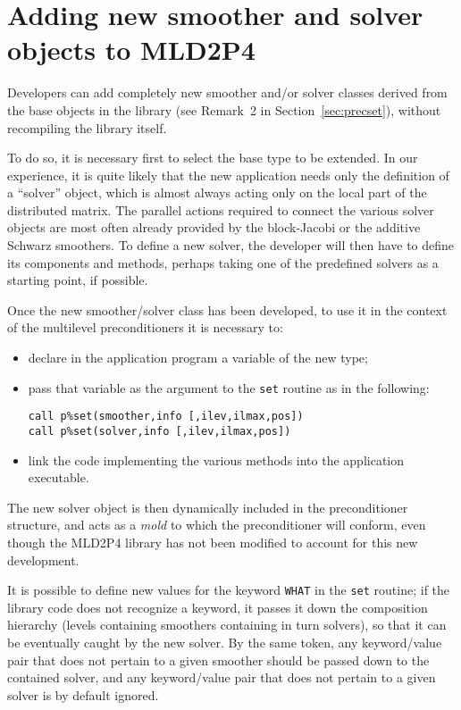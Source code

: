 
\clearpage

\section{Adding new  smoother and solver objects to MLD2P4\label{sec:adding}}

Developers can add completely new smoother and/or solver classes
derived from the base objects in the library (see Remark~2 in Section~\ref{sec:precset}),
without recompiling the library itself. 

To do so, it is necessary first to select the base type to be extended.
In our experience, it is quite likely that the new application needs
only the definition of a ``solver'' object, which is almost
always acting only on the local part of the distributed matrix. 
The parallel actions required to connect the various solver objects
are most often already provided by the block-Jacobi or the additive
Schwarz smoothers.  To define a new solver, the developer will then
have to define its components and methods, perhaps taking one of the
predefined solvers as a starting point, if possible. 

Once the new smoother/solver class has been developed, to use it in
the context of the multilevel preconditioners it is necessary to:
\begin{itemize}
\item declare in the application program a variable of the new type;
\item  pass that variable as the argument to the \verb|set| routine as in the
following:
\begin{center}
\verb|call p%set(smoother,info [,ilev,ilmax,pos])|\\
\verb|call p%set(solver,info [,ilev,ilmax,pos])|
\end{center}
\item link the code implementing the various methods into the application executable.
\end{itemize}
The new solver object is then dynamically included in the
preconditioner structure, and acts as a \emph{mold} to which the 
preconditioner will conform, even though the MLD2P4 library has not
been modified to account for this new development. 

It is possible to define new values for the keyword \verb|WHAT| in the
\verb|set| routine; if the library code does not recognize a keyword,
it passes it down the composition hierarchy (levels containing
smoothers containing in turn solvers), so that it can be eventually caught by
the new solver. By the same token, any keyword/value pair that does not pertain to
a given smoother should be passed down to the contained solver, and
any keyword/value pair that does not pertain to a given solver is by
default ignored.

